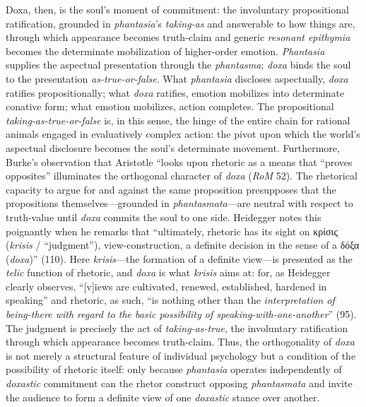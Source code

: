 \documentclass{article}
\newcommand{\gk}[1]{{\greekfont #1}}
\begin{document}
Doxa, then, is the soul's moment of commitment: the involuntary propositional ratification, grounded in \textit{phantasia}'s \textit{taking-as} and answerable to how things are, through which appearance becomes truth-claim and generic \textit{resonant epithymia} becomes the determinate mobilization of higher-order emotion. \textit{Phantasia} supplies the aspectual presentation through the \textit{phantasma}; \textit{doxa} binds the soul to the presentation \textit{as-true-or-false}. What \textit{phantasia} discloses aspectually, \textit{doxa} ratifies propositionally; what \textit{doxa} ratifies, emotion mobilizes into determinate conative form; what emotion mobilizes, action completes. The propositional \textit{taking-as-true-or-false} is, in this sense, the hinge of the entire chain for rational animals engaged in evaluatively complex action: the pivot upon which the world's aspectual disclosure becomes the soul's determinate movement. Furthermore, Burke's observation that Aristotle ``looks upon rhetoric as a means that ``proves opposites'' illuminates the orthogonal character of \textit{doxa} (\textit{RoM} 52). The rhetorical capacity to argue for and against the same proposition presupposes that the propositions themselves---grounded in \textit{phantasmata}---are  neutral with respect to truth-value until \textit{doxa} commits the soul to one side. Heidegger notes this poignantly when he remarks that ``ultimately, rhetoric has its sight on \gk{κρίσις} (\textit{krisis} / ``judgment''), view-construction, a definite decision in the sense of a \gk{δόξα} (\textit{doxa})'' (110). Here \textit{krisis}---the formation of a definite view---is presented as the \textit{telic} function of rhetoric, and \textit{doxa} is what \textit{krisis} aims at: for, as Heidegger clearly observes, ``[v]iews are cultivated, renewed, established, hardened in speaking'' and rhetoric, as such, ``is nothing other than the \textit{interpretation of being-there with regard to the basic possibility of speaking-with-one-another}'' (95). The judgment is precisely the act of \textit{taking-as-true}, the involuntary ratification through which appearance becomes truth-claim. Thus, the orthogonality of \textit{doxa} is not merely a structural feature of individual psychology but a condition of the possibility of rhetoric itself: only because \textit{phantasia} operates independently of \textit{doxastic} commitment can the rhetor construct opposing \textit{phantasmata} and invite the audience to form a definite view of one \textit{doxastic} stance over another. 
\end{document}
